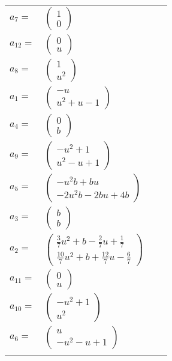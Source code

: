 \documentclass[1p]{elsarticle_modified}
\theoremstyle{definition}
\begin{document}
\begin{tabular}{m{7pt} m{180pt} m{7pt} m{180pt} }
\flushright $a_{7}=$&$\begin{pmatrix}1\\0\end{pmatrix}$ \\
\flushright $a_{12}=$&$\begin{pmatrix}0\\u\end{pmatrix}$ \\
\flushright $a_{8}=$&$\begin{pmatrix}1\\u^2\end{pmatrix}$ \\
\flushright $a_{1}=$&$\begin{pmatrix}- u\\u^2+u-1\end{pmatrix}$ \\
\flushright $a_{4}=$&$\begin{pmatrix}0\\b\end{pmatrix}$ \\
\flushright $a_{9}=$&$\begin{pmatrix}- u^2+1\\u^2- u+1\end{pmatrix}$ \\
\flushright $a_{5}=$&$\begin{pmatrix}- u^2 b+b u\\-2 u^2 b-2 b u+4 b\end{pmatrix}$ \\
\flushright $a_{3}=$&$\begin{pmatrix}b\\b\end{pmatrix}$ \\
\flushright $a_{2}=$&$\begin{pmatrix}\frac{3}{7} u^2+b-\frac{2}{7} u+\frac{1}{7}\\\frac{10}{7} u^2+b+\frac{12}{7} u-\frac{6}{7}\end{pmatrix}$ \\
\flushright $a_{11}=$&$\begin{pmatrix}0\\u\end{pmatrix}$ \\
\flushright $a_{10}=$&$\begin{pmatrix}- u^2+1\\u^2\end{pmatrix}$ \\
\flushright $a_{6}=$&$\begin{pmatrix}u\\- u^2- u+1\end{pmatrix}$\\&\end{tabular}
\end{document}
